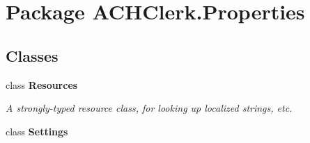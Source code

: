 \hypertarget{namespace_a_c_h_clerk_1_1_properties}{\section{Package A\+C\+H\+Clerk.\+Properties}
\label{namespace_a_c_h_clerk_1_1_properties}
}
\subsection*{Classes}
\begin{DoxyCompactItemize}
\item 
class {\bfseries Resources}
\begin{DoxyCompactList}\small\item\em A strongly-\/typed resource class, for looking up localized strings, etc. \end{DoxyCompactList}\item 
class {\bfseries Settings}
\end{DoxyCompactItemize}
